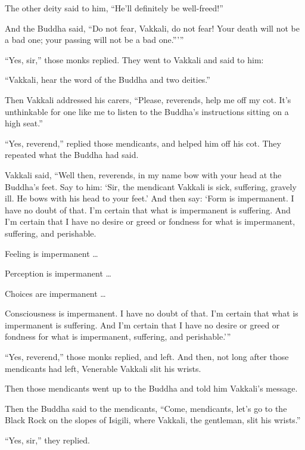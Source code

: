 \documentclass[12pt,openany]{book}%
\begin{document}
The other deity said to him, “He’ll definitely be well-freed!” 

And the Buddha said, “Do not fear, Vakkali, do not fear! Your death will not be a bad one; your passing will not be a bad one.”’” 

“Yes, sir,” those monks replied. They went to Vakkali and said to him: 

“Vakkali, hear the word of the Buddha and two deities.” 

Then Vakkali addressed his carers, “Please, reverends, help me off my cot. It’s unthinkable for one like me to listen to the Buddha’s instructions sitting on a high seat.” 

“Yes, reverend,” replied those mendicants, and helped him off his cot. They repeated what the Buddha had said. 

Vakkali said, “Well then, reverends, in my name bow with your head at the Buddha’s feet. Say to him: ‘Sir, the mendicant Vakkali is sick, suffering, gravely ill. He bows with his head to your feet.’ And then say: ‘Form is impermanent. I have no doubt of that. I’m certain that what is impermanent is suffering. And I’m certain that I have no desire or greed or fondness for what is impermanent, suffering, and perishable. 

Feeling is impermanent … 

Perception is impermanent … 

Choices are impermanent … 

Consciousness is impermanent. I have no doubt of that. I’m certain that what is impermanent is suffering. And I’m certain that I have no desire or greed or fondness for what is impermanent, suffering, and perishable.’” 

“Yes, reverend,” those monks replied, and left. And then, not long after those mendicants had left, Venerable Vakkali slit his wrists. 

Then those mendicants went up to the Buddha and told him Vakkali’s message. 

Then the Buddha said to the mendicants, “Come, mendicants, let’s go to the Black Rock on the slopes of Isigili, where Vakkali, the gentleman, slit his wrists.” 

“Yes, sir,” they replied. 
\end{document}
